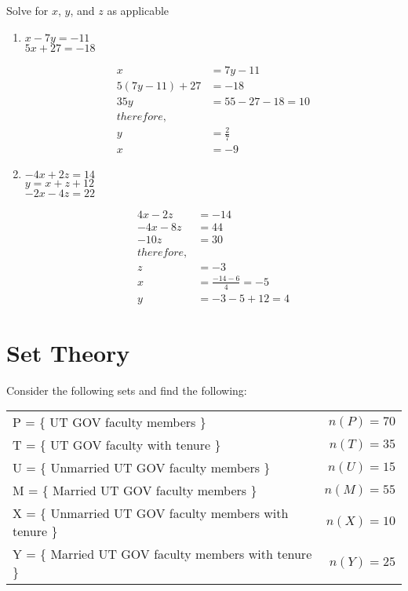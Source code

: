 \documentclass [12pt] {article}
\begin{document}
\clearpage 
Solve for $x$, $y$, and $z$ as applicable

\begin{enumerate}
    \item $x-7y = -11$ \\
    $5x + 27 = -18$

     \begin{align*} 
 x & = 7y - 11\\
5 (7y - 11)  +27 &= -18 \\
35 y &= 55 - 27 -18 = 10 \\ 
therefore, \\ 
y &= \frac{2}{7}\\
x &= -9
\end{align*}
    
    \item $-4x + 2z = 14$ \\
    $ y = x + z + 12 $ \\
    $ -2x -4z = 22 $

    \begin{align*}
        4x - 2z &= -14 \\ 
        -4x - 8z &=44 \\ 
        -10z &= 30 \\ 
        therefore, \\ 
        z &= -3\\
        x &= \frac{-14-6}{4} = -5\\
        y &= -3-5+12 = 4
    \end{align*}
    
\end{enumerate}
 
 
\newpage
\section{Set Theory}
\maketitle

Consider the following sets and find the following:\\

\begin{tabular}{@{}lr@{}}
    P = \{ UT GOV faculty members \} & $n(P) = 70$ \\
    T = \{ UT GOV faculty with tenure \} & $n(T) = 35$   \\
    U = \{ Unmarried UT GOV faculty members \} & $n(U) = 15$\\
M = \{ Married UT GOV faculty members \}& $n(M) = 55$\\
X = \{ Unmarried UT GOV faculty members with tenure \}& $n(X) = 10$\\
Y = \{ Married UT GOV faculty members with tenure \}& $n(Y ) = 25$\\
\end{tabular}
\end{document}
